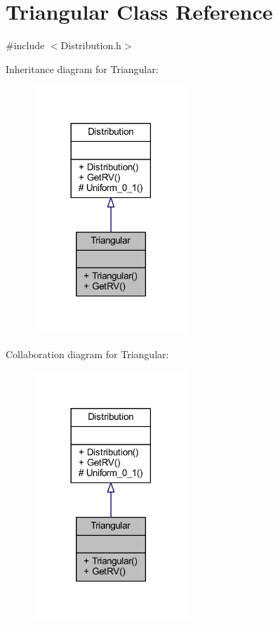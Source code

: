 \hypertarget{class_triangular}{}\section{Triangular Class Reference}
\label{class_triangular}


{\ttfamily \#include $<$Distribution.\+h$>$}



Inheritance diagram for Triangular\+:\nopagebreak
\begin{figure}[H]
\begin{center}
\leavevmode
\includegraphics[width=165pt]{class_triangular__inherit__graph}
\end{center}
\end{figure}


Collaboration diagram for Triangular\+:\nopagebreak
\begin{figure}[H]
\begin{center}
\leavevmode
\includegraphics[width=165pt]{class_triangular__coll__graph}
\end{center}
\end{figure}
